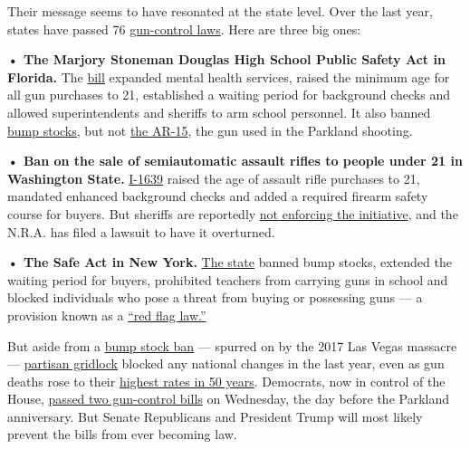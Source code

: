 Their message seems to have resonated at the state level. Over the last
year, states have passed 76
\href{https://www.nytimes3xbfgragh.onion/interactive/2018/12/14/us/politics/gun-control-laws.html}{gun-control
laws}. Here are three big ones:

\textbf{• The Marjory Stoneman Douglas High School Public Safety Act in
Florida.} The
\href{https://www.nytimes3xbfgragh.onion/2018/03/07/us/florida-shooting-gunman-indicted.html}{bill}
expanded mental health services, raised the minimum age for all gun
purchases to 21, established a waiting period for background checks and
allowed superintendents and sheriffs to arm school personnel. It also
banned
\href{https://www.nytimes3xbfgragh.onion/interactive/2017/10/04/us/bump-stock-las-vegas-gun.html}{bump
stocks}, but not
\href{https://www.nytimes3xbfgragh.onion/2018/03/08/us/florida-gun-bill.html}{the
AR-15}, the gun used in the Parkland shooting.

\textbf{• Ban on the sale of semiautomatic assault rifles to people
under 21 in Washington State.}
\href{https://www.nytimes3xbfgragh.onion/2019/01/02/us/washington-state-new-gun-law.html}{I-1639}
raised the age of assault rifle purchases to 21, mandated enhanced
background checks and added a required firearm safety course for buyers.
But sheriffs are reportedly
\href{https://www.krem.com/article/news/politics/grant-county-sheriff-joins-others-who-say-they-wont-enforce-i-1639/293-beb89b25-cce3-4150-821e-2e6a6c1b7c2b}{not
enforcing the initiative}, and the N.R.A. has filed a lawsuit to have it
overturned.

\textbf{• The Safe Act in New York.}
\href{https://www.nytimes3xbfgragh.onion/2019/01/29/nyregion/gun-laws-new-york.html}{The
state} banned bump stocks, extended the waiting period for buyers,
prohibited teachers from carrying guns in school and blocked individuals
who pose a threat from buying or possessing guns --- a provision known
as a
\href{https://www.nytimes3xbfgragh.onion/interactive/2018/12/14/us/politics/gun-control-laws.html}{``red
flag law.''}

But aside from a
\href{https://www.nytimes3xbfgragh.onion/2018/12/18/us/politics/trump-bump-stocks-ban.html}{bump
stock ban} --- spurred on by the 2017 Las Vegas massacre ---
\href{https://www.nytimes3xbfgragh.onion/2018/02/15/us/politics/congress-inaction-guns.html}{partisan
gridlock} blocked any national changes in the last year, even as gun
deaths rose to their
\href{https://www.nytimes3xbfgragh.onion/2018/12/18/us/gun-deaths.html}{highest
rates in 50 years}. Democrats, now in control of the House,
\href{https://www.nytimes3xbfgragh.onion/2019/01/08/us/politics/house-democrats-gun-control.html}{passed
two gun-control bills} on Wednesday, the day before the Parkland
anniversary. But Senate Republicans and President Trump will most likely
prevent the bills from ever becoming law.

